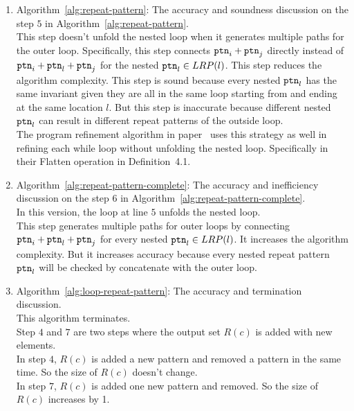 \begin{enumerate}
  \item
Algorithm~\ref{alg:repeat-pattern}:
The accuracy and soundness discussion on the step $5$ in Algorithm~\ref{alg:repeat-pattern}.
\\
This step doesn't unfold the nested loop when it generates multiple paths for the outer loop.
Specifically, this step connects  $\mathtt{ptn}_i +\mathtt{ptn}_j$ directly
instead of $\mathtt{ptn}_i + \mathtt{ptn}_l + \mathtt{ptn}_j$ for the nested $\mathtt{ptn}_l \in LRP(l)$. 
This step reduces the algorithm complexity.
This step is sound because every nested $\mathtt{ptn}_l$
has the same invariant given they are all in the same loop starting from and ending at the same location $l$.
But this step is inaccurate because different nested $\mathtt{ptn}_l$ can result in different repeat patterns of the outside loop.
\\
The program refinement algorithm in paper~\cite{GulwaniJK09} uses this strategy as well in refining each while loop without unfolding the nested loop.
Specifically in their Flatten operation in Definition~4.1.
\item
Algorithm~\ref{alg:repeat-pattern-complete}: 
The accuracy and inefficiency discussion on the step $6$ in Algorithm~\ref{alg:repeat-pattern-complete}.
\\
In this version, the loop at line $5$ unfolds the nested loop.
\\
This step generates multiple paths for outer loops by connecting $\mathtt{ptn}_i + \mathtt{ptn}_l + \mathtt{ptn}_j$ for every nested $\mathtt{ptn}_l \in LRP(l)$. 
It increases the algorithm complexity.
But it increases accuracy because every nested repeat pattern $\mathtt{ptn}_l$ will be checked by concatenate with the outer loop.
\item Algorithm~\ref{alg:loop-repeat-pattern}: The accuracy and termination discussion.
\\
This algorithm terminates.
\\
Step $4$ and $7$ are two steps where the output set $R(c)$ is added with new elements.
\\
In step $4$, $R(c)$ is added a new pattern and removed a pattern in the same time. So the size of $R(c)$ doesn't change.
\\
In step $7$, $R(c)$ is added one new pattern and removed. So the size of $R(c)$ increases by 1. 

\end{enumerate}
